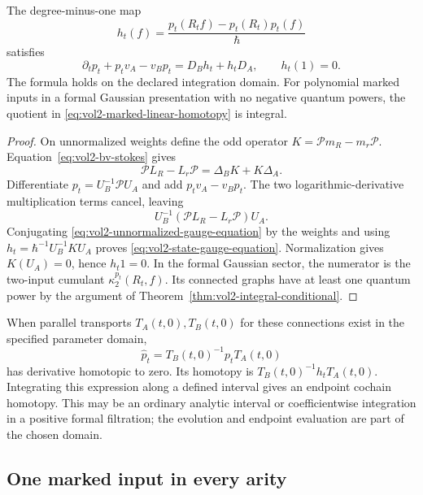 \begin{theorem}\label{thm:vol2-canonical-state-homotopy}
The degree-minus-one map
\begin{equation}\label{eq:vol2-marked-linear-homotopy}
 h_t(f)=\frac{p_t(R_tf)-p_t(R_t)p_t(f)}{\hbar}
\end{equation}
satisfies
\begin{equation}\label{eq:vol2-state-gauge-equation}
 \partial_tp_t+p_tv_A-v_Bp_t=D_Bh_t+h_tD_A,
 \qquad h_t(1)=0.
\end{equation}
The formula holds on the declared integration domain.
For polynomial marked inputs in a formal Gaussian
presentation with no negative quantum powers, the quotient
in \eqref{eq:vol2-marked-linear-homotopy} is integral.
\end{theorem}
\begin{proof}
On unnormalized weights define the odd operator
$K=\mathcal Pm_R-m_r\mathcal P$.
Equation~\eqref{eq:vol2-bv-stokes} gives
\begin{equation}\label{eq:vol2-unnormalized-gauge-equation}
 \mathcal PL_R-L_r\mathcal P
                      =\Delta_BK+K\Delta_A.
\end{equation}
Differentiate $p_t=U_B^{-1}\mathcal P U_A$ and add
$p_tv_A-v_Bp_t$. The two logarithmic-derivative
multiplication terms cancel, leaving
\[
 U_B^{-1}(\mathcal PL_R-L_r\mathcal P)U_A.
\]
Conjugating \eqref{eq:vol2-unnormalized-gauge-equation}
by the weights and using
$h_t=\hbar^{-1}U_B^{-1}KU_A$ proves
\eqref{eq:vol2-state-gauge-equation}.
Normalization gives $K(U_A)=0$, hence $h_t1=0$.
In the formal Gaussian sector, the numerator is the
two-input cumulant $\kappa_2^{p_t}(R_t,f)$.
Its connected graphs have at least one quantum power by
the argument of Theorem~\ref{thm:vol2-integral-conditional}.
\end{proof}

When parallel transports $T_A(t,0),T_B(t,0)$ for these
connections exist in the specified parameter domain,
\[
 \widehat p_t=T_B(t,0)^{-1}p_tT_A(t,0)
\]
has derivative homotopic to zero. Its homotopy is
$T_B(t,0)^{-1}h_tT_A(t,0)$.
Integrating this expression along a defined interval gives
an endpoint cochain homotopy. This may be an ordinary
analytic interval or coefficientwise integration in a
positive formal filtration; the evolution and endpoint
evaluation are part of the chosen domain.

\subsection{One marked input in every arity}

